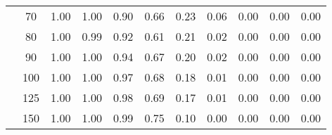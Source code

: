 \begin{table}[t]
\begin{center}
\begin{subtable}[c]{\textwidth}
\begin{center}
\begin{tabular}{rcccccccccc}
                                        & \multicolumn{1}{c|}{70}  & \num{1.00}  & \num{1.00}  & \num{0.90}  & \num{0.66}  & \num{0.23}  & \num{0.06}  & \num{0.00}  & \num{0.00}  & \num{0.00}  \\
                                        & \multicolumn{1}{c|}{80}  & \num{1.00}  & \num{0.99}  & \num{0.92}  & \num{0.61}  & \num{0.21}  & \num{0.02}  & \num{0.00}  & \num{0.00}  & \num{0.00}  \\
                                        & \multicolumn{1}{c|}{90}  & \num{1.00}  & \num{1.00}  & \num{0.94}  & \num{0.67}  & \num{0.20}  & \num{0.02}  & \num{0.00}  & \num{0.00}  & \num{0.00}  \\
                                        & \multicolumn{1}{c|}{100}  & \num{1.00}  & \num{1.00}  & \num{0.97}  & \num{0.68}  & \num{0.18}  & \num{0.01}  & \num{0.00}  & \num{0.00}  & \num{0.00}  \\
                                        & \multicolumn{1}{c|}{125}  & \num{1.00}  & \num{1.00}  & \num{0.98}  & \num{0.69}  & \num{0.17}  & \num{0.01}  & \num{0.00}  & \num{0.00}  & \num{0.00}  \\
                                        & \multicolumn{1}{c|}{150}  & \num{1.00}  & \num{1.00}  & \num{0.99}  & \num{0.75}  & \num{0.10}  & \num{0.00}  & \num{0.00}  & \num{0.00}  & \num{0.00}  \\
                                    \end{tabular}
            \end{center}
        \end{subtable}

        \vspace{5mm}


\end{center}
\end{table}
